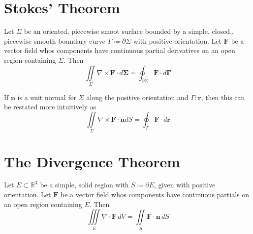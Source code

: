 \section{Stokes' Theorem}
\begin{theorem}[Stokes]
    Let \(\Sigma \) be an oriented, piecewise smoot surface bounded by a simple, closed,, piecewise smooth boundary curve \(\Gamma \coloneqq \partial \Sigma \) with positive orientation. Let \(\mathbf{F} \) be a vector field whos components have continuous partial derivatives on an open region containing \(\Sigma \). Then
    \[
        \iint\limits_{\Sigma }\nabla \times \mathbf{F} \cdot d \boldsymbol{\Sigma} = \oint_{\partial \Sigma }\mathbf{F} \cdot d \boldsymbol{\Gamma}
    \]
\end{theorem}
If \(\mathbf{n} \) is a unit normal for \(\Sigma \) along the positive orientation and \(\Gamma :\mathbf{r} \), then this can be restated more intuitively as 
\[
    \iint\limits_{\Sigma }\nabla \times \mathbf{F} \cdot \mathbf{n} dS = \oint_{\Gamma }\mathbf{F} \cdot d \mathbf{r} 
\]
\section{The Divergence Theorem}
\begin{theorem}
    Let \(E \subset \mathbb{R}^3\) be a simple, solid region with \(S\coloneqq \partial E\), given with positive orientation. Let \(\mathbf{F} \) be a vector field whos components have continuous partials on an open region containing \(E\). Then
    \[
        \iiint\limits_{E}\nabla \cdot \mathbf{F} \,dV = \iint\limits_{S}\mathbf{F} \cdot \mathbf{n} \,dS
    \]
\end{theorem}